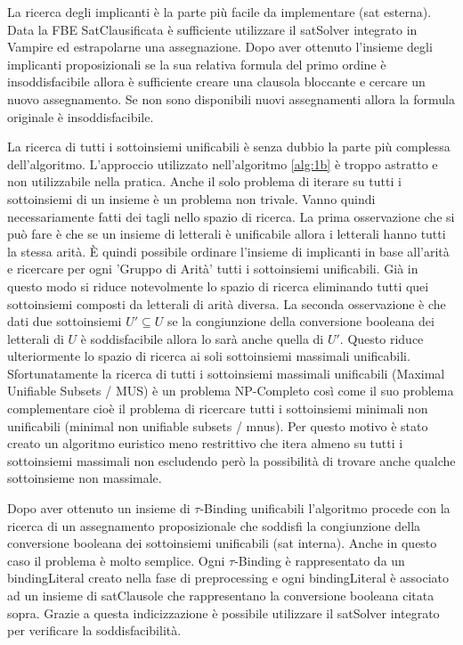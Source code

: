 \documentclass[./main.tex]{subfiles}
\begin{document}
La ricerca degli implicanti è la parte più facile da implementare (sat esterna). 
Data la FBE SatClausificata è sufficiente utilizzare il satSolver integrato in Vampire ed estrapolarne una assegnazione.
Dopo aver ottenuto l'insieme degli implicanti proposizionali se la sua relativa 
formula del primo ordine è insoddisfacibile allora è sufficiente creare una clausola bloccante e cercare un nuovo assegnamento.
Se non sono disponibili nuovi assegnamenti allora la formula originale è insoddisfacibile.

La ricerca di tutti i sottoinsiemi unificabili è senza dubbio la parte più complessa dell'algoritmo.
L'approccio utilizzato nell'algoritmo \ref{alg:1b} è troppo astratto e non utilizzabile nella pratica.
Anche il solo problema di iterare su tutti i sottoinsiemi di un insieme è un problema non trivale.
Vanno quindi necessariamente fatti dei tagli nello spazio di ricerca.
La prima osservazione che si può fare è che se un insieme di letterali è unificabile allora i letterali hanno tutti la stessa arità.
È quindi possibile ordinare l'insieme di implicanti in base all'arità e ricercare per ogni 'Gruppo di Arità' tutti i sottoinsiemi unificabili.
Già in questo modo si riduce notevolmente lo spazio di ricerca eliminando tutti quei sottoinsiemi composti da letterali di arità diversa.
La seconda osservazione è che dati due sottoinsiemi $U' \subseteq U$ se la congiunzione della conversione booleana dei letterali di $U$ è 
soddisfacibile allora lo sarà anche quella di $U'$. 
Questo riduce ulteriormente lo spazio di ricerca ai soli sottoinsiemi massimali unificabili.
Sfortunatamente la ricerca di tutti i sottoinsiemi massimali unificabili (Maximal Unifiable Subsets / MUS) è un problema NP-Completo così come 
il suo problema complementare cioè il problema di ricercare tutti i sottoinsiemi minimali non unificabili (minimal non unifiable subsets / mnus).
Per questo motivo è stato creato un algoritmo euristico meno restrittivo che itera almeno su tutti i sottoinsiemi massimali
non escludendo però la possibilità di trovare anche qualche sottoinsieme non massimale.

Dopo aver ottenuto un insieme di $\tau$-Binding unificabili l'algoritmo procede con la ricerca di un 
assegnamento proposizionale che soddisfi la congiunzione della conversione booleana dei sottoinsiemi unificabili (sat interna).
Anche in questo caso il problema è molto semplice. Ogni $\tau$-Binding è rappresentato da un bindingLiteral creato nella fase di preprocessing e
ogni bindingLiteral è associato ad un insieme di satClausole che rappresentano la conversione booleana citata sopra. 
Grazie a questa indicizzazione è possibile utilizzare il satSolver integrato per verificare la soddisfacibilità.
\end{document}
